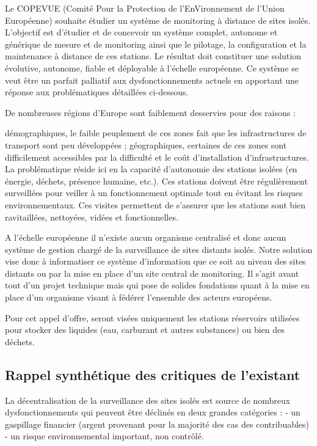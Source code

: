 \documentclass[a4paper]{article}
\begin{document}
Le COPEVUE (Comité Pour la Protection de l'EnVironnement de l'Union Européenne) souhaite étudier un système de monitoring à distance de sites isolés. L'objectif est d'étudier et de concevoir un système complet, autonome et générique de mesure et de monitoring ainsi que le pilotage, la configuration et la maintenance à distance de ces stations. Le résultat doit constituer une solution évolutive, autonome, fiable et déployable à l'échelle européenne. Ce système se veut être un parfait palliatif aux dysfonctionnements actuels en apportant une réponse aux problématiques détaillées ci-dessous.

De nombreuses régions d'Europe sont faiblement desservies pour des raisons :

démographiques, le faible peuplement de ces zones fait que les infrastructures de transport sont peu développées ;
géographiques, certaines de ces zones sont difficilement accessibles par la difficulté et le coût d'installation d'infrastructures.
La problématique réside ici en la capacité d'autonomie des stations isolées (en énergie, déchets, présence humaine, etc.). Ces stations doivent être régulièrement surveillées pour veiller à un fonctionnement optimale tout en évitant les risques environnementaux. Ces visites permettent de s'assurer que les stations sont bien ravitaillées, nettoyées, vidées et fonctionnelles.

A l'échelle européenne il n'existe aucun organisme centralisé et donc aucun système de gestion chargé de la surveillance de sites distants isolés. Notre solution vise donc à informatiser ce système d'information que ce soit au niveau des sites distants ou par la mise en place d'un site central de monitoring. Il s'agit avant tout d'un projet technique mais qui pose de solides fondations quant à la mise en place d'un organisme visant à fédérer l'ensemble des acteurs européens.

Pour cet appel d'offre, seront visées uniquement les stations réservoirs utilisées pour stocker des liquides (eau, carburant et autres substances) ou bien des déchets.

\subsection{Rappel synthétique des critiques de l’existant}

La décentralisation de la surveillance des sites isolés est source de nombreux dysfonctionnements qui peuvent être déclinés en deux grandes catégories : - un gaspillage financier (argent provenant pour la majorité des cas des contribuables) - un risque environnemental important, non contrôlé.
\end{document}
